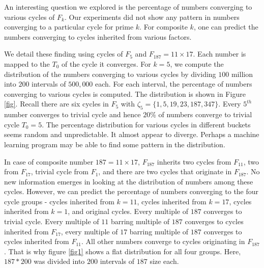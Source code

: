 \documentclass[12pt]{article} %
\begin{document}
An interesting question we explored is the percentage of numbers converging to various cycles of $F_k$. Our experiments did not show any  pattern in numbers converging to a particular cycle for prime $k$. For composite $k$, one can predict the numbers converging to cycles inherited from various factors.  

We detail these finding using cycles of $F_5$ and $F_{187} = 11 \times 17$.  Each number is mapped to the $T_0$ of the cycle it converges. For $k=5$, we compute the distribution of the numbers converging to various cycles by dividing  $100$ million into $200$ intervals of $500,000$ each. For each interval, the percentage of numbers converging to various cycles is computed. The distribution is shown in Figure \ref{fig}. Recall there are six cycles in $F_5$ with $\zeta_5 = \{1, 5, 19, 23, 187, 347\}$. Every $5^{th}$ number converges to trivial cycle and hence $20\%$ of numbers converge to trivial cycle $T_0=5$. The percentage distribution for various cycles in different buckets seems random and unpredictable. It almost appear to diverge. Perhaps a machine learning program may be able to find some pattern in the distribution.

In case of composite number $187 = 11 \times 17$, $F_{187}$ inherits two cycles from $F_{11}$, two from $F_{17}$, trivial cycle from $F_1$, and there are two cycles that originate in $F_{187}$. No new information emerges in looking at the distribution of numbers among these cycles. However, we can predict the percentage of numbers converging to the four cycle groups - cycles inherited from $k=11$, cycles inherited from $k=17$, cycles inherited from $k=1$, and original cycles. Every multiple of $187$ converges to trivial cycle. Every multiple of $11$ barring multiple of $187$ converges to cycles inherited from $F_{17}$, every multiple of $17$ barring multiple of $187$ converges to cycles inherited from $F_{11}$. All other numbers converge to cycles originating in $F_{187}$. That is why figure \ref{fig1} shows a flat distribution for all four groups. Here, $187*200$ was divided into $200$ intervals of $187$ size each.
\end{document}
